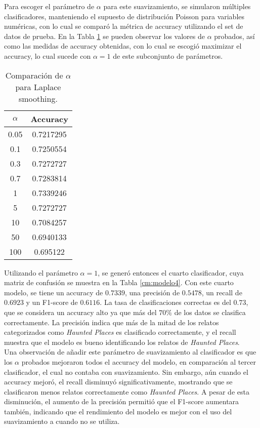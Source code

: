 \documentclass[12pt, letterpaper]{report}
\begin{document}
Para escoger el parámetro de $\alpha$ para este suavizamiento, se simularon múltiples clasificadores, manteniendo el supuesto de distribución Poisson para variables numéricas, con lo cual se comparó la métrica de accuracy utilizando el set de datos de prueba. En la Tabla \ref{tab:laplace} se pueden observar los valores de $\alpha$ probados, así como las medidas de accuracy obtenidas, con lo cual se escogió maximizar el accuracy, lo cual sucede con $\alpha=1$ de este subconjunto de parámetros.

\begin{table}[H]
    \centering
    \begin{tabular}{|c|c|}
    \hline
        $\alpha$ & \textbf{Accuracy} \\
        \hline
        0.05 & 0.7217295 \\
        \hline
        0.1 & 0.7250554 \\
        \hline
        0.3 & 0.7272727 \\
        \hline
        0.7 & 0.7283814 \\
        \hline
        1 & 0.7339246 \\
        \hline
        5 & 0.7272727 \\
        \hline
        10 & 0.7084257 \\
        \hline
        50 & 0.6940133 \\
        \hline
        100 & 0.695122 \\
        \hline
    \end{tabular}
    \caption{Comparación de $\alpha$ para Laplace smoothing.}
    \label{tab:laplace}
\end{table}

Utilizando el parámetro $\alpha=1$, se generó entonces el cuarto clasificador, cuya matriz de confusión se muestra en la Tabla \ref{cm:modelo4}. Con este cuarto modelo, se tiene un accuracy de $0.7339$, una precisión de $0.5478$, un recall de $0.6923$ y un F1-score de $0.6116$. La tasa de clasificaciones correctas es del $0.73$, que se considera un accuracy alto ya que más del $70\%$ de los datos se clasifica correctamente. La precisión indica que más de la mitad de los relatos categorizados como \textit{Haunted Places} es clasificado correctamente, y el recall muestra que el modelo es bueno identificando los relatos de \textit{Haunted Places}.
\\

Una observación de añadir este parámetro de suavizamiento al clasificador es que los $\alpha$ probados mejoraron todos el accuracy del modelo, en comparación al tercer clasificador, el cual no contaba con suavizamiento. Sin embargo, aún cuando el accuracy mejoró, el recall disminuyó significativamente, mostrando que se clasificaron menos relatos correctamente como \textit{Haunted Places}. A pesar de esta disminución, el aumento de la precisión permitió que el F1-score aumentara también, indicando que el rendimiento del modelo es mejor con el uso del suavizamiento a cuando no se utiliza.
\end{document}
